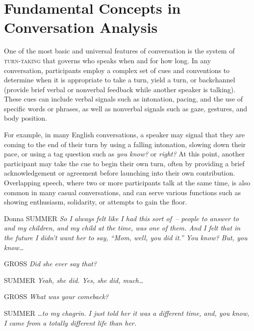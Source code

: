 \section{Fundamental Concepts in Conversation Analysis}

One of the most basic and universal features of conversation is the system of \textsc{turn-taking} that governs who speaks when and for how long. In any conversation, participants employ a complex set of cues and conventions to determine when it is appropriate to take a turn, yield a turn, or backchannel (provide brief verbal or nonverbal feedback while another speaker is talking). These cues can include verbal signals such as intonation, pacing, and the use of specific words or phrases, as well as nonverbal signals such as gaze, gestures, and body position.

For example, in many English conversations, a speaker may signal that they are coming to the end of their turn by using a falling intonation, slowing down their pace, or using a tag question such as \textit{you know?} or \textit{right?} At this point, another participant may take the cue to begin their own turn, often by providing a brief acknowledgement or agreement before launching into their own contribution. Overlapping speech, where two or more participants talk at the same time, is also common in many casual conversations, and can serve various functions such as showing enthusiasm, solidarity, or attempts to gain the floor.

\begin{dialogue}
 \item[Donna SUMMER] \textit{So I always felt like I had this sort of~-- people to answer to and my children, and my child at the time, was one of them. And I felt that in the future I didn't want her to say, ``Mom, well, you did it.'' You know? But, you know\dots} \\
 \item[GROSS] \textit{Did she ever say that?} \\
 \item[SUMMER] \textit{Yeah, she did. Yes, she did, much\dots}\\
 \item[GROSS] \textit{What was your comeback?} \\
 \item[SUMMER] \dots\textit{to my chagrin. I just told her it was a different time, and, you know, I came from a totally different life than her.}
\end{dialogue}

